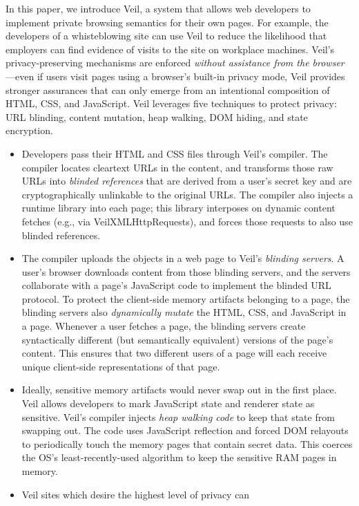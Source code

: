 In this paper, we introduce Veil, a system
that allows web developers to implement
private browsing semantics for their own pages.
For example, the developers of a whisteblowing
site can use Veil to reduce the likelihood
that employers can find evidence of visits to
the site on workplace machines.
Veil's privacy-preserving mechanisms are
enforced \emph{without assistance from the
	browser}---even if users visit pages using
a browser's built-in privacy mode, Veil
provides stronger assurances that
can only emerge from an intentional
composition of HTML, CSS, and JavaScript.
Veil leverages five techniques to protect
privacy: URL blinding, content mutation,
heap walking, DOM hiding, and state encryption.
\begin{itemize}
	\item Developers pass their HTML and CSS files through
	Veil's compiler. The compiler locates cleartext
	URLs in the content, and transforms those raw
	URLs into \emph{blinded references} that are
	derived from a user's secret key and are
	cryptographically unlinkable to the original
	URLs. The compiler also injects a runtime
	library into each page; this library interposes
	on dynamic content fetches (e.g., via
	Veil{XMLHttpRequests}), and forces those
	requests to also use blinded references.
	\item The compiler uploads the objects in a web page to
	Veil's \emph{blinding servers}. A user's browser
	downloads content from those blinding servers, and
	the servers collaborate with a page's JavaScript
	code to implement the blinded URL protocol. To
	protect the client-side memory artifacts belonging
	to a page, the blinding servers also \emph{dynamically
		mutate} the HTML, CSS, and JavaScript in a page.
	Whenever a user fetches a page, the blinding servers
	create syntactically different (but semantically
	equivalent) versions of the page's content. This
	ensures that two different users of a page will
	each receive unique client-side representations
	of that page.
	\item Ideally, sensitive memory artifacts would never
	swap out in the first place. Veil allows developers
	to mark JavaScript state and renderer state as
	sensitive. Veil's compiler injects \emph{heap
		walking code} to keep that state from swapping out.
	The code uses JavaScript reflection
	and forced DOM relayouts to periodically touch the
	memory pages that contain secret data. This coerces
	the OS's least-recently-used algorithm to keep the
	sensitive RAM pages in memory.
	\item Veil sites which desire the highest level of privacy can

\end{itemize}
